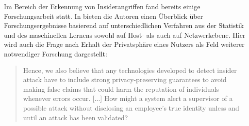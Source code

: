 Im Bereich der Erkennung von Insiderangriffen fand bereits einige Forschungsarbeit statt. In \cite{salem2008survey} bieten die Autoren einen Überblick über Forschungsergebnisse basierend auf unterschiedlichen Verfahren aus der Statistik und des maschinellen Lernens sowohl auf Host- als auch auf Netzwerkebene. Hier wird auch die Frage nach Erhalt der Privatsphäre eines Nutzers als Feld weiterer notwendiger Forschung dargestellt:

\begin{quotation}
Hence, we also believe that any technologies developed
to detect insider attack have to include strong privacy-preserving guarantees
to avoid making false claims that could harm the reputation of individuals
whenever errors occur. [...] 
How might a system alert a supervisor of a possible attack without disclosing
an employee’s true identity unless and until an attack has been validated?
\cite{salem2008survey}
\end{quotation}





